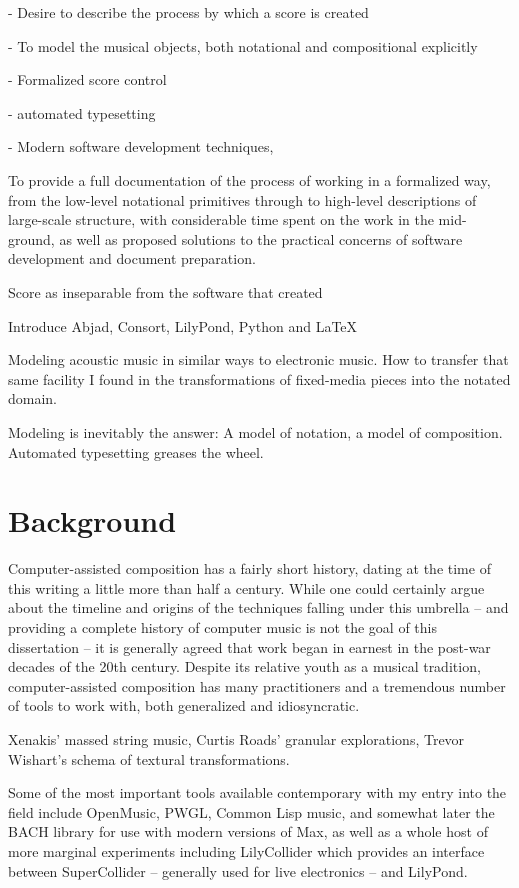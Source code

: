 -   Desire to describe the process by which a score is created

-   To model the musical objects, both notational and compositional explicitly

-   Formalized score control

-   automated typesetting

-   Modern software development techniques, 

To provide a full documentation of the process of working in a formalized way,
from the low-level notational primitives through to high-level descriptions of
large-scale structure, with considerable time spent on the work in the
mid-ground, as well as proposed solutions to the practical concerns of software
development and document preparation.

Score as inseparable from the software that created

Introduce Abjad, Consort, LilyPond, Python and \LaTeX{}

Modeling acoustic music in similar ways to electronic music. How to transfer
that same facility I found in the transformations of fixed-media pieces into 
the notated domain.

Modeling is inevitably the answer: A model of notation, a model of composition.
Automated typesetting greases the wheel.

\section{Background}
\label{sec:background}

Computer-assisted composition has a fairly short history, dating at the time of
this writing a little more than half a century. While one could certainly argue
about the timeline and origins of the techniques falling under this umbrella --
and providing a complete history of computer music is not the goal of this
dissertation -- it is generally agreed that work began in earnest in the
post-war decades of the 20th century.\cite{curtis1996computer,
xenakis1992formalized} Despite its relative youth as a musical tradition,
computer-assisted composition has many practitioners and a tremendous number
of tools to work with, both generalized and idiosyncratic.

Xenakis' massed string music, Curtis Roads' granular explorations, Trevor
Wishart's schema of textural transformations.

Some of the most important tools available contemporary with my entry into the
field include OpenMusic, PWGL, Common Lisp music, and somewhat later the BACH
library for use with modern versions of Max, as well as a whole host of more
marginal experiments including LilyCollider which provides an interface between
SuperCollider -- generally used for live electronics -- and LilyPond.

